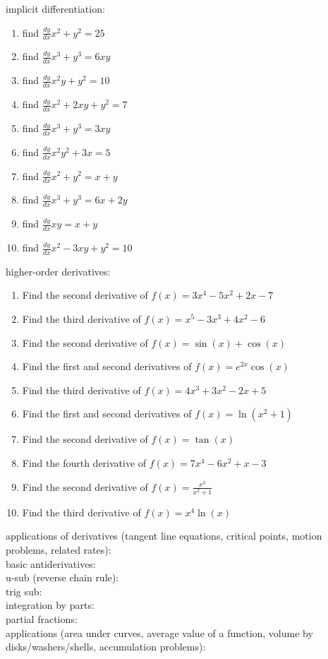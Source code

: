 \documentclass{article}
\begin{document}
implicit differentiation:
\begin{enumerate}
	\item find $\frac{dy}{dx} x^2 + y^2 = 25$
	\item find $\frac{dy}{dx} x^3 + y^3 = 6xy$
	\item find $\frac{dy}{dx} x^2y + y^2 = 10$
	\item find $\frac{dy}{dx} x^2 + 2xy + y^2 = 7$
	\item find $\frac{dy}{dx} x^3 + y^3 = 3xy$
	\item find $\frac{dy}{dx} x^2y^2 + 3x = 5$
	\item find $\frac{dy}{dx} x^2 + y^2 = x + y$
	\item find $\frac{dy}{dx} x^3 + y^3 = 6x + 2y$
	\item find $\frac{dy}{dx} xy = x + y$
	\item find $\frac{dy}{dx} x^2 - 3xy + y^2 = 10$
\end{enumerate}

higher-order derivatives:
\begin{enumerate}
        \item Find the second derivative of $f(x) = 3x^4 - 5x^2 + 2x - 7$
        \item Find the third derivative of $f(x) = x^5 - 3x^3 + 4x^2 - 6$
        \item Find the second derivative of $f(x) = \sin(x) + \cos(x)$
        \item Find the first and second derivatives of $f(x) = e^{2x} \cos(x)$
        \item Find the third derivative of $f(x) = 4x^3 + 3x^2 - 2x + 5$
        \item Find the first and second derivatives of $f(x) = \ln(x^2 + 1)$
        \item Find the second derivative of $f(x) = \tan(x)$
        \item Find the fourth derivative of $f(x) = 7x^4 - 6x^2 + x - 3$
        \item Find the second derivative of $f(x) = \frac{x^3}{x^2 + 1}$
        \item Find the third derivative of $f(x) = x^4 \ln(x)$
\end{enumerate}

applications of derivatives (tangent line equations, critical points, motion problems, related rates):\\

basic antiderivatives:\\

u-sub (reverse chain rule):\\

trig sub:\\

integration by parts:\\

partial fractions:\\

applications (area under curves, average value of a function, volume by disks/washers/shells, accumulation problems):\\
\end{document}
